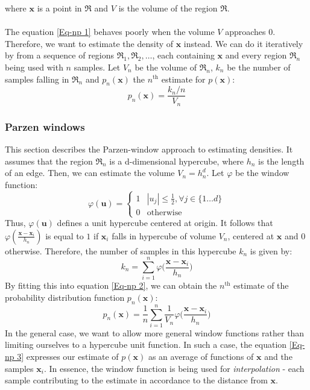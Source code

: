 	where $\mathbf{x}$ is a point in $\mathfrak{R}$ and $V$ is the volume of the region $\mathfrak{R}$.
	\\ \\
	The equation \ref{Eq-np 1} behaves poorly when the volume $V$ approaches 0. Therefore, we want to estimate the density of $\mathbf{x}$ instead. We can do it iteratively by from a sequence of regions $\mathfrak{R}_1, \mathfrak{R}_2, \dots$, each containing $\mathbf{x}$ and every region $\mathfrak{R}_n$ being used with $n$ samples. Let $V_n$ be the volume of $\mathfrak{R}_n$, $k_n$ be the number of samples falling in $\mathfrak{R}_n$ and $p_n(\mathbf{x})$ the $n^\text{th}$ estimate for $p(\mathbf{x})$:
	\begin{equation}
		p_n(\mathbf{x}) = \frac{k_n/n}{V_n}
		\label{Eq-np 2}
	\end{equation}
	
	\subsubsection{Parzen windows}
	This section describes the Parzen-window approach to estimating densities. It assumes that the region $\mathfrak{R}_n$ is a d-dimensional hypercube, where $h_n$ is the length of an edge. Then, we can estimate the volume $V_n = h_n^d$. Let $\varphi$ be the window function:
	\begin{equation}
		\varphi(\mathbf{u}) = \begin{cases}
											 1 & |u_j| \leq \frac{1}{2}, \forall j \in \{1\dots d\} \\
											 0 & \text{otherwise}
									   	\end{cases}
	\end{equation}
	Thus, $\varphi(\mathbf{u})$ defines a unit hypercube centered at origin. It follows that $\varphi(\frac{\mathbf{x} - \mathbf{x}_i}{h_n})$ is equal to $1$ if $\mathbf{x}_i$ falls in hypercube of volume $V_n$, centered at $\mathbf{x}$ and $0$ otherwise. Therefore, the number of samples in this hypercube $k_n$ is given by:
	\begin{equation}
		k_n = \sum_{i=1}^{n} \varphi \bigg(\frac{\mathbf{x} - \mathbf{x}_i}{h_n}\bigg)
	\end{equation}
	By fitting this into equation \ref{Eq-np 2}, we can obtain the $n^{\text{th}}$ estimate of the probability distribution function $p_n(\mathbf{x})$: 
	\begin{equation}
		p_n(\mathbf{x}) = \frac{1}{n} \sum_{i=1}^{n} \frac{1}{V_n} \varphi \bigg( \frac{\mathbf{x} - \mathbf{x}_i}{h_n} \bigg)
		\label{Eq-np 3}
 	\end{equation} 
 	In the general case, we want to allow more general window functions rather than limiting ourselves to a hypercube unit function. In such a case, the equation \ref{Eq-np 3} expresses our estimate of $p(\mathbf{x})$ as an average of functions of $\mathbf{x}$ and the samples $\mathbf{x}_i$. In essence, the window function is being used for \textit{interpolation} - each sample contributing to the estimate in accordance to the distance from $\mathbf{x}$.
 	

